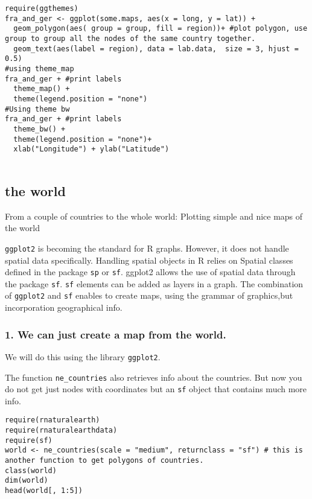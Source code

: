 \documentclass[
]{book}
\theoremstyle{definition}
\theoremstyle{definition}
\theoremstyle{definition}
\theoremstyle{definition}
\theoremstyle{remark}
\begin{document}
\begin{verbatim}
require(ggthemes)
fra_and_ger <- ggplot(some.maps, aes(x = long, y = lat)) +
  geom_polygon(aes( group = group, fill = region))+ #plot polygon, use group to group all the nodes of the same country together. 
  geom_text(aes(label = region), data = lab.data,  size = 3, hjust = 0.5)
#using theme_map
fra_and_ger + #print labels
  theme_map() +
  theme(legend.position = "none")
#Using theme bw
fra_and_ger + #print labels
  theme_bw() +
  theme(legend.position = "none")+
  xlab("Longitude") + ylab("Latitude")
 
\end{verbatim}

\hypertarget{the-world}{%
\subsection{the world}\label{the-world}}

From a couple of countries to the whole world: Plotting simple and nice maps of the world

\texttt{ggplot2} is becoming the standard for R graphs. However, it does not handle spatial data specifically. Handling spatial objects in R relies on Spatial classes defined in the package \texttt{sp} or \texttt{sf}. ggplot2 allows the use of spatial data through the package \texttt{sf}. \texttt{sf} elements can be added as layers in a graph. The combination of \texttt{ggplot2} and \texttt{sf} enables to create maps, using the grammar of graphics,but incorporation geographical info.

\hypertarget{we-can-just-create-a-map-from-the-world.}{%
\subsubsection{1. We can just create a map from the world.}\label{we-can-just-create-a-map-from-the-world.}}

We will do this using the library \texttt{ggplot2}.

The function \texttt{ne\_countries} also retrieves info about the countries. But now you do not get just nodes with coordinates but an \texttt{sf} object that contains much more info.

\begin{verbatim}
require(rnaturalearth)
require(rnaturalearthdata)
require(sf)
world <- ne_countries(scale = "medium", returnclass = "sf") # this is another function to get polygons of countries. 
class(world)
dim(world)
head(world[, 1:5])
\end{verbatim}
\end{document}
